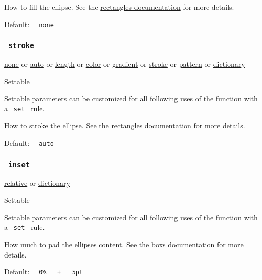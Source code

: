 How to fill the ellipse. See the
\href{/docs/reference/visualize/rect/\#parameters-fill}{rectangle\textquotesingle s
documentation} for more details.

Default: \texttt{\ }{\texttt{\ none\ }}\texttt{\ }

\subsubsection{\texorpdfstring{\texttt{\ stroke\ }}{ stroke }}\label{parameters-stroke}

\href{/docs/reference/foundations/none/}{none} {or}
\href{/docs/reference/foundations/auto/}{auto} {or}
\href{/docs/reference/layout/length/}{length} {or}
\href{/docs/reference/visualize/color/}{color} {or}
\href{/docs/reference/visualize/gradient/}{gradient} {or}
\href{/docs/reference/visualize/stroke/}{stroke} {or}
\href{/docs/reference/visualize/pattern/}{pattern} {or}
\href{/docs/reference/foundations/dictionary/}{dictionary}

{{ Settable }}

\label{parameters-stroke-settable-tooltip}
Settable parameters can be customized for all following uses of the
function with a \texttt{\ set\ } rule.

How to stroke the ellipse. See the
\href{/docs/reference/visualize/rect/\#parameters-stroke}{rectangle\textquotesingle s
documentation} for more details.

Default: \texttt{\ }{\texttt{\ auto\ }}\texttt{\ }

\subsubsection{\texorpdfstring{\texttt{\ inset\ }}{ inset }}\label{parameters-inset}

\href{/docs/reference/layout/relative/}{relative} {or}
\href{/docs/reference/foundations/dictionary/}{dictionary}

{{ Settable }}

\label{parameters-inset-settable-tooltip}
Settable parameters can be customized for all following uses of the
function with a \texttt{\ set\ } rule.

How much to pad the ellipse\textquotesingle s content. See the
\href{/docs/reference/layout/box/\#parameters-inset}{box\textquotesingle s
documentation} for more details.

Default:
\texttt{\ }{\texttt{\ 0\%\ }}\texttt{\ }{\texttt{\ +\ }}\texttt{\ }{\texttt{\ 5pt\ }}\texttt{\ }

